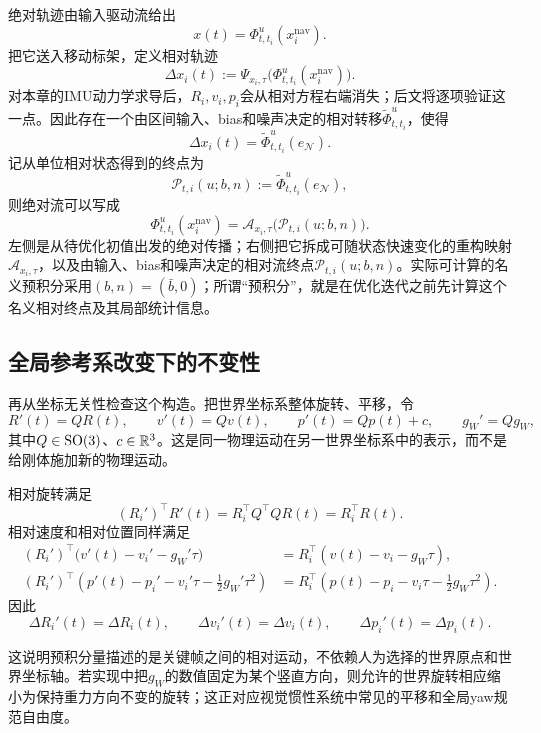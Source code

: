 绝对轨迹由输入驱动流给出
\[
    x(t)=\Phi^u_{t,t_i}(x_i^{\mathrm{nav}}).
\]
把它送入移动标架，定义相对轨迹
\[
    \Delta x_i(t)
    :=\Psi_{x_i,\tau}\bigl(
      \Phi^u_{t,t_i}(x_i^{\mathrm{nav}})
    \bigr).
\]
对本章的IMU动力学求导后，$R_i,v_i,p_i$会从相对方程右端消失；后文将逐项验证这一点。因此存在一个由区间输入、bias和噪声决定的相对转移$\widetilde\Phi^u_{t,t_i}$，使得
\[
    \Delta x_i(t)
    =\widetilde\Phi^u_{t,t_i}(e_{\mathcal N}).
\]
记从单位相对状态得到的终点为
\[
    \mathcal P_{t,i}(u;b,n)
    :=\widetilde\Phi^u_{t,t_i}(e_{\mathcal N}),
\]
则绝对流可以写成
\[
\boxed{
    \Phi^u_{t,t_i}(x_i^{\mathrm{nav}})
    =\mathcal A_{x_i,\tau}
      \bigl(\mathcal P_{t,i}(u;b,n)\bigr).
}
\]
左侧是从待优化初值出发的绝对传播；右侧把它拆成可随状态快速变化的重构映射$\mathcal A_{x_i,\tau}$，以及由输入、bias和噪声决定的相对流终点$\mathcal P_{t,i}(u;b,n)$。实际可计算的名义预积分采用$(b,n)=(\bar b,0)$；所谓“预积分”，就是在优化迭代之前先计算这个名义相对终点及其局部统计信息。

\subsection{全局参考系改变下的不变性}

再从坐标无关性检查这个构造。把世界坐标系整体旋转、平移，令
\[
    R'(t)=Q R(t),
    \qquad
    v'(t)=Qv(t),
    \qquad
    p'(t)=Qp(t)+c,
    \qquad
    g_W'=Qg_W,
\]
其中$Q\in\operatorname{SO}(3)$、$c\in\mathbb{R}^3$。这是同一物理运动在另一世界坐标系中的表示，而不是给刚体施加新的物理运动。

相对旋转满足
\[
    (R_i')^\top R'(t)
    =R_i^\top Q^\top Q R(t)
    =R_i^\top R(t).
\]
相对速度和相对位置同样满足
\[
\begin{aligned}
    (R_i')^\top
    \bigl(v'(t)-v_i'-g_W'\tau\bigr)
    &=R_i^\top(v(t)-v_i-g_W\tau),\\
    (R_i')^\top
    \left(
      p'(t)-p_i'-v_i'\tau-\frac12g_W'\tau^2
    \right)
    &=R_i^\top
      \left(
        p(t)-p_i-v_i\tau-\frac12g_W\tau^2
      \right).
\end{aligned}
\]
因此
\[
\boxed{
    \Delta R_i'(t)=\Delta R_i(t),
    \qquad
    \Delta v_i'(t)=\Delta v_i(t),
    \qquad
    \Delta p_i'(t)=\Delta p_i(t).
}
\]

这说明预积分量描述的是关键帧之间的相对运动，不依赖人为选择的世界原点和世界坐标轴。若实现中把$g_W$的数值固定为某个竖直方向，则允许的世界旋转相应缩小为保持重力方向不变的旋转；这正对应视觉惯性系统中常见的平移和全局yaw规范自由度。


